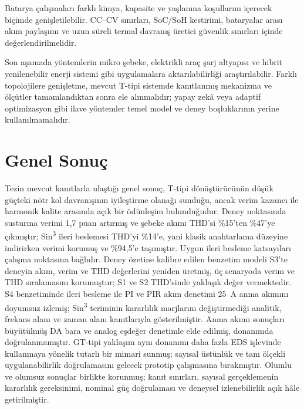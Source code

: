 Batarya çalışmaları farklı kimya, kapasite ve yaşlanma koşullarını içerecek biçimde genişletilebilir. CC--CV sınırları, SoC/SoH kestirimi, bataryalar arası akım paylaşımı ve uzun süreli termal davranış üretici güvenlik sınırları içinde değerlendirilmelidir.

Son aşamada yöntemlerin mikro şebeke, elektrikli araç şarj altyapısı ve hibrit yenilenebilir enerji sistemi gibi uygulamalara aktarılabilirliği araştırılabilir. Farklı topolojilere genişletme, mevcut T-tipi sistemde kanıtlanmış mekanizma ve ölçütler tamamlandıktan sonra ele alınmalıdır; yapay zekâ veya adaptif optimizasyon gibi ilave yöntemler temel model ve deney boşluklarının yerine kullanılmamalıdır.

\section{Genel Sonuç}

Tezin mevcut kanıtlarla ulaştığı genel sonuç, T-tipi dönüştürücünün düşük güçteki nötr kol davranışının iyileştirme olanağı sunduğu, ancak verim kazancı ile harmonik kalite arasında açık bir ödünleşim bulunduğudur. Deney noktasında susturma verimi 1,7 puan artırmış ve şebeke akımı THD'si \%15'ten \%47'ye çıkmıştır; Sin\textsuperscript{3} ileri beslemesi THD'yi \%14'e, yani klasik anahtarlama düzeyine indirirken verimi korumuş ve \%94,5'e taşımıştır. Uygun ileri besleme katsayıları çalışma noktasına bağlıdır. Deney özetine kalibre edilen benzetim modeli S3'te deneyin akım, verim ve THD değerlerini yeniden üretmiş, üç senaryoda verim ve THD sıralamasını korumuştur; S1 ve S2 THD'sinde yaklaşık değer vermektedir. S4 benzetiminde ileri besleme ile PI ve PIR akım denetimi \SI{25}{\ampere} anma akımını doyumsuz izlemiş; Sin\textsuperscript{3} teriminin kararlılık marjlarını değiştirmediği analitik, frekans alanı ve zaman alanı kanıtlarıyla gösterilmiştir. Anma akımı sonuçları büyütülmüş DA bara ve analog eşdeğer denetimle elde edilmiş, donanımda doğrulanmamıştır. GT-tipi yaklaşım aynı donanımı daha fazla EDS işlevinde kullanmaya yönelik tutarlı bir mimari sunmuş; sayısal üstünlük ve tam ölçekli uygulanabilirlik doğrulamasını gelecek prototip çalışmasına bırakmıştır. Olumlu ve olumsuz sonuçlar birlikte korunmuş; kanıt sınırları, sayısal gerçeklemenin kararlılık gereksinimi, nominal güç doğrulaması ve deneysel izlenebilirlik açık hâle getirilmiştir.
